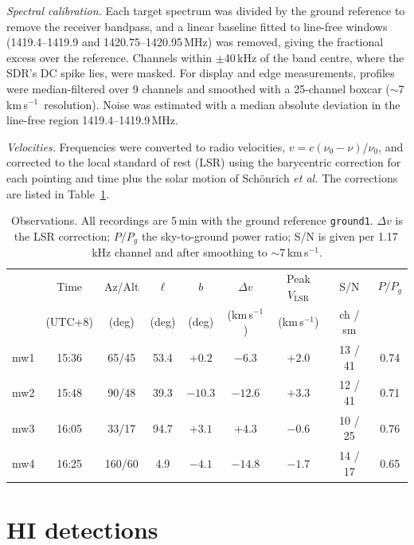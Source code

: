 \documentclass[aip,apl,reprint,amsmath,amssymb]{revtex4-2}
\newcommand{\kms}{km\,s$^{-1}$}
\newcommand{\vlsr}{V_\mathrm{LSR}}
\begin{document}
\textit{Spectral calibration.} Each target spectrum was divided by the ground reference to remove the receiver bandpass, and a linear baseline fitted to line-free windows (1419.4--1419.9 and 1420.75--1420.95\,MHz) was removed, giving the fractional excess over the reference. Channels within $\pm$40\,kHz of the band centre, where the SDR's DC spike lies, were masked. For display and edge measurements, profiles were median-filtered over 9 channels and smoothed with a 25-channel boxcar ($\sim$7\,\kms\ resolution). Noise was estimated with a median absolute deviation in the line-free region 1419.4--1419.9\,MHz.

\textit{Velocities.} Frequencies were converted to radio velocities, $v = c(\nu_0 - \nu)/\nu_0$, and corrected to the local standard of rest (LSR) using the barycentric correction for each pointing and time plus the solar motion of Sch\"onrich \textit{et al.}\cite{Schoenrich2010} The corrections are listed in Table~\ref{tab:obs}.

\begin{table}[t]
\caption{Observations. All recordings are 5\,min with the ground reference \texttt{ground1}. $\Delta v$ is the LSR correction; $P/P_g$ the sky-to-ground power ratio; S/N is given per 1.17\,kHz channel and after smoothing to $\sim$7\,\kms.}
\label{tab:obs}
\begin{ruledtabular}
\begin{tabular}{lcccccccc}
 & Time & Az/Alt & $\ell$ & $b$ & $\Delta v$ & Peak $\vlsr$ & S/N & $P/P_g$ \\
 & (UTC+8) & (deg) & (deg) & (deg) & (\kms) & (\kms) & ch / sm & \\
\hline
mw1 & 15:36 & 65/45  & 53.4 & $+0.2$  & $-6.3$  & $+2.0$ & 13 / 41 & 0.74 \\
mw2 & 15:48 & 90/48  & 39.3 & $-10.3$ & $-12.6$ & $+3.3$ & 12 / 41 & 0.71 \\
mw3 & 16:05 & 33/17  & 94.7 & $+3.1$  & $+4.3$  & $-0.6$ & 10 / 25 & 0.76 \\
mw4 & 16:25 & 160/60 & 4.9  & $-4.1$  & $-14.8$ & $-1.7$ & 14 / 17 & 0.65 \\
\end{tabular}
\end{ruledtabular}
\end{table}

\section{HI detections}
\end{document}
